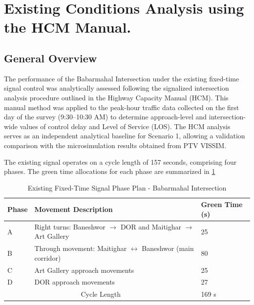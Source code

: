 \pagebreak
\section{Existing Conditions Analysis using the HCM Manual.}

\subsection{General Overview}

The performance of the Babarmahal Intersection under the 
existing fixed-time signal control was analytically assessed 
following the signalized intersection analysis procedure 
outlined in the Highway Capacity Manual (HCM). This manual 
method was applied to the peak-hour traffic data collected 
on the first day of the survey (9:30–10:30 AM) to determine 
approach-level and intersection-wide values of control delay 
and Level of Service (LOS). The HCM analysis serves as an 
independent analytical baseline for Scenario 1, allowing a 
validation comparison with the microsimulation results 
obtained from PTV VISSIM.

The existing signal operates on a cycle length of 157 
seconds, comprising four phases. The green time allocations 
for each phase are summarized in \cref{tab:ftsplan}

\begin{table}[h]
\centering
\renewcommand{\arraystretch}{1.5}
\caption{Existing Fixed-Time Signal Phase Plan - Babarmahal Intersection}
\begin{tabular}{|l|p{8cm}|l|}
    \hline
    \textbf{Phase} & \textbf{Movement Description} & \textbf{Green Time (s)} \\
    \hline
    A & Right turns: Baneshwor $\rightarrow$ DOR and  Maitighar $\rightarrow$ Art Gallery & 25   \\
    \hline
    B & Through movement: Maitighar $\leftrightarrow$ Baneshwor (main corridor) & 80 \\

    \hline
    C & Art Gallery approach movements & 25  \\

    \hline
    D & DOR approach movements & 27  \\
    \hline
    \multicolumn{2}{|c|}{Cycle Length} & 169 s \\
    \hline
    
\end{tabular}
\label{tab:ftsplan}
\end{table}


